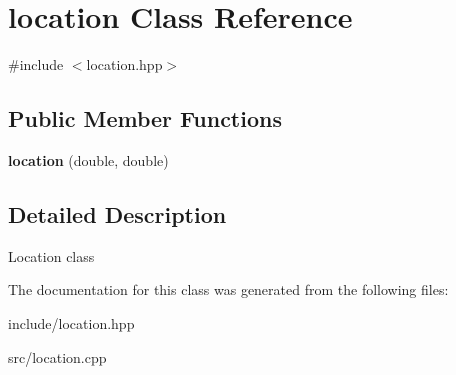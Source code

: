 \hypertarget{classlocation}{}\section{location Class Reference}
\label{classlocation}


{\ttfamily \#include $<$location.\+hpp$>$}

\subsection*{Public Member Functions}
\begin{DoxyCompactItemize}
\item 
{\bfseries location} (double, double)\hypertarget{classlocation_a04f6d09c1b12f7c75fabb9c6556fbb9d}{}\label{classlocation_a04f6d09c1b12f7c75fabb9c6556fbb9d}

\end{DoxyCompactItemize}


\subsection{Detailed Description}
Location class 

The documentation for this class was generated from the following files\+:\begin{DoxyCompactItemize}
\item 
include/location.\+hpp\item 
src/location.\+cpp\end{DoxyCompactItemize}
